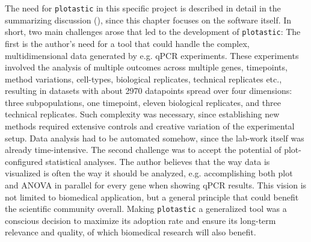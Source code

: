 The need for \texttt{plotastic} in this specific project is described in detail
in the summarizing discussion
(), since this chapter focuses
on the software itself. In short, two main challenges arose that led to the
development of \texttt{plotastic}: The first is the author's need for a tool
that could handle the complex, multidimensional data generated by e.g. qPCR
experiments. These experiments involved the analysis of multiple outcomes across
multiple genes, timepoints, method variations, cell-types, biological
replicates, technical replicates etc., resulting in datasets with about 2970
datapoints spread over four dimensions: three subpopulations, one timepoint,
eleven biological replicates, and three technical replicates. Such complexity
was necessary, since establishing new methods required extensive controls and
creative variation of the experimental setup. Data analysis had to be automated
somehow, since the lab-work itself was already time-intensive. The second
challenge was to accept the potential of plot-configured statistical analyses.
The author believes that the way data is visualized is often the way it should
be analyzed, e.g. accomplishing both plot and ANOVA in parallel for every gene
when showing qPCR results. This vision is not limited to biomedical application,
but a general principle that could benefit the scientific community overall.
Making \texttt{plotastic} a generalized tool was a conscious decision to
maximize its adoption rate and ensure its long-term relevance and quality, of
which biomedical research will also benefit.













